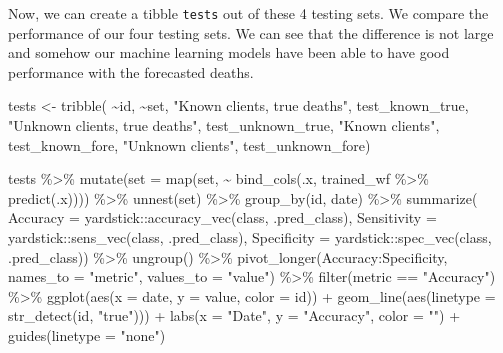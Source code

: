 \documentclass[
]{article}
\newenvironment{Shaded}{\begin{snugshade}}{\end{snugshade}}
\newcommand{\AttributeTok}[1]{\textcolor[rgb]{0.77,0.63,0.00}{#1}}
\newcommand{\FunctionTok}[1]{\textcolor[rgb]{0.00,0.00,0.00}{#1}}
\newcommand{\NormalTok}[1]{#1}
\newcommand{\OtherTok}[1]{\textcolor[rgb]{0.56,0.35,0.01}{#1}}
\newcommand{\SpecialCharTok}[1]{\textcolor[rgb]{0.00,0.00,0.00}{#1}}
\newcommand{\StringTok}[1]{\textcolor[rgb]{0.31,0.60,0.02}{#1}}
\begin{document}
Now, we can create a tibble \texttt{tests} out of these 4 testing sets.
We compare the performance of our four testing sets. We can see that the
difference is not large and somehow our machine learning models have
been able to have good performance with the forecasted deaths.

\begin{Shaded}
\begin{Highlighting}[]
\NormalTok{tests }\OtherTok{\textless{}{-}}
  \FunctionTok{tribble}\NormalTok{(}
    \SpecialCharTok{\textasciitilde{}}\NormalTok{id, }\SpecialCharTok{\textasciitilde{}}\NormalTok{set,}
    \StringTok{"Known clients, true deaths"}\NormalTok{, test\_known\_true,}
    \StringTok{"Unknown clients, true deaths"}\NormalTok{, test\_unknown\_true,}
    \StringTok{"Known clients"}\NormalTok{, test\_known\_fore,}
    \StringTok{"Unknown clients"}\NormalTok{, test\_unknown\_fore)}

\NormalTok{tests }\SpecialCharTok{\%\textgreater{}\%}
  \FunctionTok{mutate}\NormalTok{(}\AttributeTok{set =} \FunctionTok{map}\NormalTok{(set, }\SpecialCharTok{\textasciitilde{}} \FunctionTok{bind\_cols}\NormalTok{(.x, trained\_wf }\SpecialCharTok{\%\textgreater{}\%} \FunctionTok{predict}\NormalTok{(.x)))) }\SpecialCharTok{\%\textgreater{}\%}
  \FunctionTok{unnest}\NormalTok{(set) }\SpecialCharTok{\%\textgreater{}\%}
  \FunctionTok{group\_by}\NormalTok{(id, date) }\SpecialCharTok{\%\textgreater{}\%}
  \FunctionTok{summarize}\NormalTok{(}
      \AttributeTok{Accuracy =}\NormalTok{ yardstick}\SpecialCharTok{::}\FunctionTok{accuracy\_vec}\NormalTok{(class, .pred\_class),}
      \AttributeTok{Sensitivity =}\NormalTok{ yardstick}\SpecialCharTok{::}\FunctionTok{sens\_vec}\NormalTok{(class, .pred\_class),}
      \AttributeTok{Specificity =}\NormalTok{ yardstick}\SpecialCharTok{::}\FunctionTok{spec\_vec}\NormalTok{(class, .pred\_class)) }\SpecialCharTok{\%\textgreater{}\%}
  \FunctionTok{ungroup}\NormalTok{() }\SpecialCharTok{\%\textgreater{}\%}
  \FunctionTok{pivot\_longer}\NormalTok{(Accuracy}\SpecialCharTok{:}\NormalTok{Specificity, }\AttributeTok{names\_to =} \StringTok{"metric"}\NormalTok{, }\AttributeTok{values\_to =} \StringTok{"value"}\NormalTok{) }\SpecialCharTok{\%\textgreater{}\%}
  \FunctionTok{filter}\NormalTok{(metric }\SpecialCharTok{==} \StringTok{"Accuracy"}\NormalTok{) }\SpecialCharTok{\%\textgreater{}\%}
  \FunctionTok{ggplot}\NormalTok{(}\FunctionTok{aes}\NormalTok{(}\AttributeTok{x =}\NormalTok{ date, }\AttributeTok{y =}\NormalTok{ value, }\AttributeTok{color =}\NormalTok{ id)) }\SpecialCharTok{+}
  \FunctionTok{geom\_line}\NormalTok{(}\FunctionTok{aes}\NormalTok{(}\AttributeTok{linetype =} \FunctionTok{str\_detect}\NormalTok{(id, }\StringTok{"true"}\NormalTok{))) }\SpecialCharTok{+}
  \FunctionTok{labs}\NormalTok{(}\AttributeTok{x =} \StringTok{"Date"}\NormalTok{, }\AttributeTok{y =} \StringTok{"Accuracy"}\NormalTok{, }\AttributeTok{color =} \StringTok{""}\NormalTok{) }\SpecialCharTok{+} \FunctionTok{guides}\NormalTok{(}\AttributeTok{linetype =} \StringTok{"none"}\NormalTok{)}
\end{Highlighting}
\end{Shaded}
\end{document}
